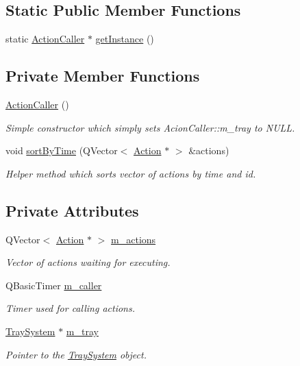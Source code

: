 \subsection*{Static Public Member Functions}
\begin{DoxyCompactItemize}
\item 
static \hyperlink{class_action_caller}{Action\-Caller} $\ast$ \hyperlink{class_action_caller_ab62a3a145a4bf356301223626c971caa}{get\-Instance} ()
\end{DoxyCompactItemize}
\subsection*{Private Member Functions}
\begin{DoxyCompactItemize}
\item 
\hyperlink{class_action_caller_ade1d4e98911f0407ea76bd4fbd0c800d}{Action\-Caller} ()
\begin{DoxyCompactList}\small\item\em Simple constructor which simply sets Acion\-Caller\-::m\-\_\-tray to N\-U\-L\-L. \end{DoxyCompactList}\item 
void \hyperlink{class_action_caller_a7ee278ab3ce0aa70dfa5a8a5f7166027}{sort\-By\-Time} (Q\-Vector$<$ \hyperlink{class_action}{Action} $\ast$ $>$ \&actions)
\begin{DoxyCompactList}\small\item\em Helper method which sorts vector of actions by time and id. \end{DoxyCompactList}\end{DoxyCompactItemize}
\subsection*{Private Attributes}
\begin{DoxyCompactItemize}
\item 
Q\-Vector$<$ \hyperlink{class_action}{Action} $\ast$ $>$ \hyperlink{class_action_caller_a8f9d25115bddbe5bb415d2c1a42e92c8}{m\-\_\-actions}
\begin{DoxyCompactList}\small\item\em Vector of actions waiting for executing. \end{DoxyCompactList}\item 
Q\-Basic\-Timer \hyperlink{class_action_caller_ae5f4d1fd24c21f19f69d4fc40339ce26}{m\-\_\-caller}
\begin{DoxyCompactList}\small\item\em Timer used for calling actions. \end{DoxyCompactList}\item 
\hyperlink{class_tray_system}{Tray\-System} $\ast$ \hyperlink{class_action_caller_a718babb42edf522f7d24d99a6fb3c1a0}{m\-\_\-tray}
\begin{DoxyCompactList}\small\item\em Pointer to the \hyperlink{class_tray_system}{Tray\-System} object. \end{DoxyCompactList}\end{DoxyCompactItemize}
